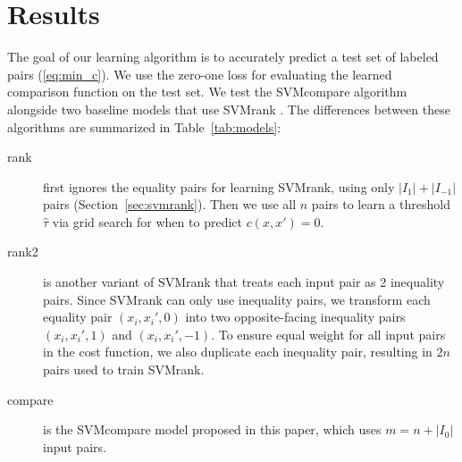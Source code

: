 \documentclass{article}
\begin{document}

\section{Results}
\label{sec:results}

The goal of our learning algorithm is to accurately predict a test set
of labeled pairs (\ref{eq:min_c}). We use the zero-one loss for
evaluating the learned comparison function on the test set.
We test the SVMcompare algorithm alongside two baseline models that
use SVMrank \citep{ranksvm}. The differences between these algorithms
are summarized in Table~\ref{tab:models}:

\begin{description}
\item[rank] first ignores the equality pairs for learning SVMrank,
  using only $|I_1|+|I_{-1}|$ pairs (Section~\ref{sec:svmrank}). Then
  we use all $n$ pairs to learn a threshold $\hat \tau$ via grid
  search for when to predict $c(x,x')=0$.
\item[rank2] is another variant of SVMrank that treats each input pair
  as 2 inequality pairs. Since SVMrank can only use inequality pairs,
  we transform each equality pair $(x_i,x_i',0)$ into two
  opposite-facing inequality pairs $(x_i,x_i',1)$ and
  $(x_i,x_i',-1)$. To ensure equal weight for all input pairs in the
  cost function, we also duplicate each inequality pair, resulting in
  $2n$ pairs used to train SVMrank.
\item[compare] is the SVMcompare model proposed in this paper, which
  uses $m=n+|I_0|$ input pairs.
\end{description}
\end{document}
